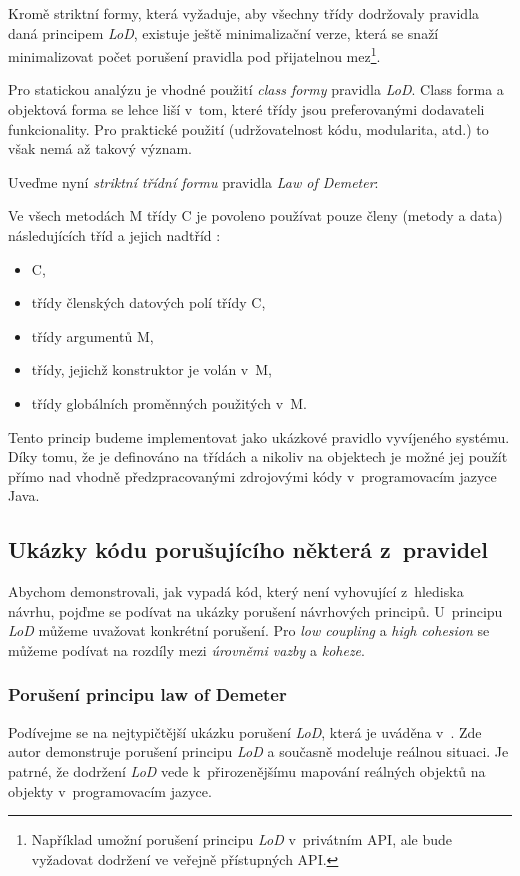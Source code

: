 Kromě striktní formy, která vyžaduje, aby všechny třídy dodržovaly pravidla daná principem \emph{LoD}, existuje ještě minimalizační verze, která se snaží minimalizovat počet porušení pravidla pod přijatelnou mez\footnote{Například umožní porušení principu \emph{LoD} v~privátním API, ale bude vyžadovat dodržení ve veřejně přístupných API.}.

Pro statickou analýzu je vhodné použití \emph{class formy} pravidla \emph{LoD}. Class forma a objektová forma se lehce liší v~tom, které třídy jsou preferovanými dodavateli funkcionality. Pro praktické použití (udržovatelnost kódu, modularita, atd.) to však nemá až takový význam.

Uveďme nyní \emph{striktní třídní formu} pravidla \emph{Law of Demeter}:

\begin{designprinciple}
  Ve všech metodách M třídy C je povoleno používat pouze členy (metody a data) následujících tříd a jejich nadtříd \cite{35588}:
  \begin{itemize}
  \item C,
  \item třídy členských datových polí třídy C,
  \item třídy argumentů M,
  \item třídy, jejichž konstruktor je volán v~M,
  \item třídy globálních proměnných použitých v~M.
  \end{itemize}
\end{designprinciple}

Tento princip budeme implementovat jako ukázkové pravidlo vyvíjeného systému. Díky tomu, že je definováno na třídách a nikoliv na objektech je možné jej použít přímo nad vhodně předzpracovanými zdrojovými kódy v~programovacím jazyce Java.

\subsection{Ukázky kódu porušujícího některá z~pravidel}
Abychom demonstrovali, jak vypadá kód, který není vyhovující z~hlediska návrhu, pojďme se podívat na ukázky porušení návrhových principů. U~principu \emph{LoD} můžeme uvažovat konkrétní porušení. Pro \emph{low coupling} a \emph{high cohesion} se můžeme podívat na rozdíly mezi \emph{úrovněmi vazby} a \emph{koheze}.

\subsubsection{Porušení principu law of Demeter}
Podívejme se na nejtypičtější ukázku porušení \emph{LoD}, která je uváděna v~\cite{lod:paperboy}. Zde autor demonstruje porušení principu \emph{LoD} a současně modeluje reálnou situaci. Je patrné, že dodržení \emph{LoD} vede k~přirozenějšímu mapování reálných objektů na objekty v~programovacím jazyce.

